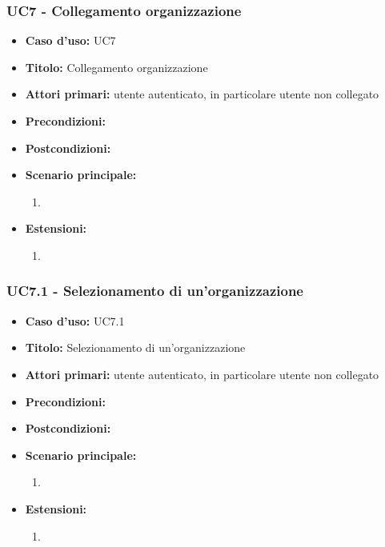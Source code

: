 \documentclass[casi-duso]{subfiles}
\begin{document}
\subsubsection{UC7 - Collegamento organizzazione}
\label{subsub:uc7utente}
\begin{itemize}
  \item \textbf{Caso d’uso:} UC7
  \item \textbf{Titolo:} Collegamento organizzazione
  \item \textbf{Attori primari:} utente autenticato, in particolare utente non collegato
  \item \textbf{Precondizioni:} 
  \item \textbf{Postcondizioni:}
  \item \textbf{Scenario principale:} 
  \begin{enumerate}
    \item 
  \end{enumerate}  
  \item \textbf{Estensioni:} 
  \begin{enumerate}
    \item 
  \end{enumerate}  
\end{itemize}

\subsubsection{UC7.1 - Selezionamento di un'organizzazione}
\label{subsub:uc7utente}
\begin{itemize}
  \item \textbf{Caso d’uso:} UC7.1
  \item \textbf{Titolo:} Selezionamento di un'organizzazione
  \item \textbf{Attori primari:} utente autenticato, in particolare utente non collegato
  \item \textbf{Precondizioni:} 
  \item \textbf{Postcondizioni:}
  \item \textbf{Scenario principale:} 
  \begin{enumerate}
    \item 
  \end{enumerate}  
  \item \textbf{Estensioni:} 
  \begin{enumerate}
    \item 
  \end{enumerate}  
\end{itemize}
\end{document}
